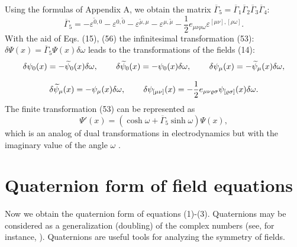 \documentclass[a4paper,12pt]{article}
\begin{document}
Using the formulas of Appendix A, we obtain the matrix
$\overline{\Gamma }_5=\overline{\Gamma }_1\overline{\Gamma
}_2\overline{\Gamma }_3\overline{\Gamma }_4$:
\begin{equation}
\overline{\Gamma }_5=-\varepsilon ^{\widetilde{0},0}-\varepsilon
^{0,\widetilde{0}}-\varepsilon ^{\widetilde{\mu },\mu
}-\varepsilon ^{{\mu },\widetilde{\mu}}-\frac 12 e_{\mu \nu \rho
\omega }\varepsilon ^{[\mu \nu],[\rho \omega ]} . \label{56}
\end{equation}
With the aid of Eqs. (15), (56) the infinitesimal transformation
(53): $\delta \Psi (x)= \overline{\Gamma }_5\Psi (x)\delta \omega$
leads to the transformations of the fields (14):
\[
\delta \psi_0 (x)=-\widetilde{\psi}_0 (x)\delta\omega
,\hspace{0.3in}\delta \widetilde{\psi}_0 (x)=-\psi_0
(x)\delta\omega , \hspace{0.3in} \delta \psi_\mu
(x)=-\widetilde{\psi}_\mu (x)\delta\omega ,
\]
\vspace{-7mm}
\begin{equation}
\label{57}
\end{equation}
\vspace{-7mm}
\[
\delta \widetilde{\psi}_\mu (x)=-\psi_\mu (x)\delta\omega
,\hspace{0.3in} \delta
\psi_{[\mu\nu]}(x)=-\frac{1}{2}e_{\mu\nu\varrho\sigma}
\psi_{[\varrho\sigma]}(x)\delta\omega .
\]
The finite transformation (53) can be represented as
\[
 \Psi'(x)=\left(\cosh \omega + \overline{\Gamma }_5
 \sinh \omega \right)\Psi (x) ,
\]
which is an analog of dual transformations in electrodynamics but
with the imaginary value of the angle $\omega$ \cite{monogr}.

\section{Quaternion form of field equations}

Now we obtain the quaternion form of equations (1)-(3).
Quaternions may be considered as a generalization (doubling) of
the complex numbers (see, for instance, \cite{Casanova}).
Quaternions are useful tools for analyzing the symmetry of fields.
\end{document}
